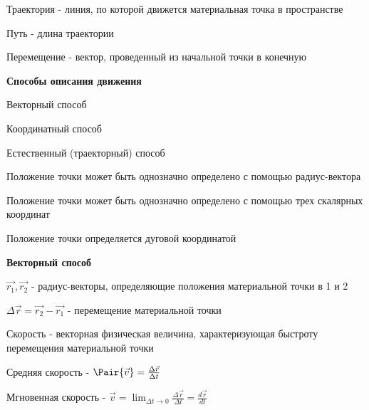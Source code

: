 \documentclass[12pt]{article}
\begin{document}
    \Def Траектория - линия, по которой движется материальная точка в пространстве

    \Def Путь - длина траектории

    \Def Перемещение - вектор, проведенный из начальной точки в конечную

    \smallvspace

    \textbf{Способы описания движения}

    \begin{multicols}{3}

        \begin{tcolorbox}
            Векторный способ
        \end{tcolorbox}

        \begin{tcolorbox}
            Координатный способ
        \end{tcolorbox}

        \begin{tcolorbox}
            Естественный (траекторный) способ
        \end{tcolorbox}

    \end{multicols}

    \begin{multicols}{3}

        Положение точки может быть однозначно определено с помощью радиус-вектора

        \smallvspace

        Положение точки может быть однозначно определено с помощью трех скалярных координат

        Положение точки определяется дуговой координатой

        \phantom{.}

    \end{multicols}

    \textbf{Векторный способ}

    $\vec{r_1}, \vec{r_2}$ - радиус-векторы, определяющие положения материальной точки в 1 и 2

    $\Delta \vec{r} = \vec{r_2} - \vec{r_1}$ - перемещение материальной точки

    \Def Скорость - векторная физическая величина, характеризующая быстроту перемещения материальной точки

    Средняя скорость - $\Pair{\vec{v}} = \frac{\Delta \vec{r}}{\Delta t}$

    Мгновенная скорость - $\vec{v} = \lim_{\Delta t \to 0} \frac{\Delta \vec{r}}{\Delta t} = \frac{d \vec{r}}{dt}$
\end{document}
